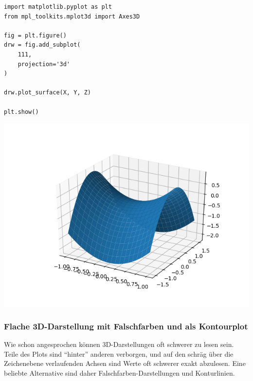 \begin{codebox}[Beispiel: Ausgefülltes Drahtgittermodell, width=.55\linewidth, nobeforeafter, equal height group = grpXmpSurface3D]
\begin{verbatim}
import matplotlib.pyplot as plt
from mpl_toolkits.mplot3d import Axes3D

fig = plt.figure()
drw = fig.add_subplot(
    111,
    projection='3d'
)

drw.plot_surface(X, Y, Z)

plt.show()
\end{verbatim}
\end{codebox}
%
\begin{tcolorbox}[title=Ausgabe: Ausgef. Drahtgittermodell, width=.45\linewidth, nobeforeafter, equal height group = grpXmpSurface3D]
	\includegraphics[width=\linewidth]{./gfx/plt-surface3D}
\end{tcolorbox}

\subsubsection{Flache 3D-Darstellung mit Falschfarben und als Kontourplot}
Wie schon angesprochen können 3D-Darstellungen oft schwerer zu lesen sein. Teile des Plots sind \enquote{hinter} anderen verborgen, und auf den schräg über die Zeichenebene verlaufenden Achsen sind Werte oft schwerer exakt abzulesen. Eine beliebte Alternative sind daher Falschfarben-Darstellungen und Konturlinien.

